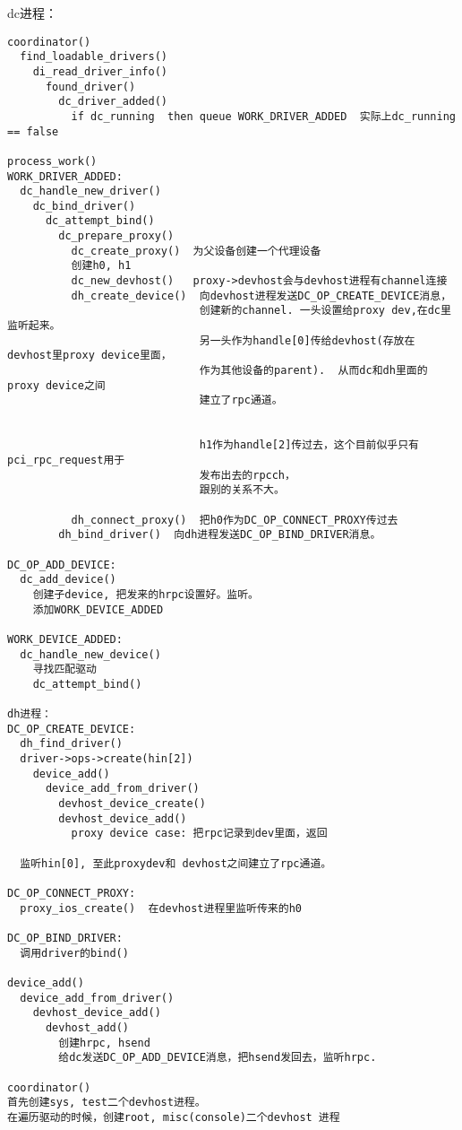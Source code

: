 dc进程：
\begin{verbatim}
coordinator()
  find_loadable_drivers()
    di_read_driver_info()
      found_driver()
        dc_driver_added()
          if dc_running  then queue WORK_DRIVER_ADDED  实际上dc_running == false

process_work()
WORK_DRIVER_ADDED:
  dc_handle_new_driver()
    dc_bind_driver()
      dc_attempt_bind()
        dc_prepare_proxy()
          dc_create_proxy()  为父设备创建一个代理设备
          创建h0, h1
          dc_new_devhost()   proxy->devhost会与devhost进程有channel连接
          dh_create_device()  向devhost进程发送DC_OP_CREATE_DEVICE消息，
                              创建新的channel. 一头设置给proxy dev,在dc里监听起来。
                              另一头作为handle[0]传给devhost(存放在devhost里proxy device里面，
                              作为其他设备的parent).  从而dc和dh里面的proxy device之间
                              建立了rpc通道。


                              h1作为handle[2]传过去，这个目前似乎只有pci_rpc_request用于
                              发布出去的rpcch，
                              跟别的关系不大。

          dh_connect_proxy()  把h0作为DC_OP_CONNECT_PROXY传过去
        dh_bind_driver()  向dh进程发送DC_OP_BIND_DRIVER消息。

DC_OP_ADD_DEVICE:
  dc_add_device()
    创建子device, 把发来的hrpc设置好。监听。
    添加WORK_DEVICE_ADDED

WORK_DEVICE_ADDED:
  dc_handle_new_device()
    寻找匹配驱动
    dc_attempt_bind()
                
dh进程：
DC_OP_CREATE_DEVICE:
  dh_find_driver()
  driver->ops->create(hin[2])
    device_add()
      device_add_from_driver()
        devhost_device_create()
        devhost_device_add()
          proxy device case: 把rpc记录到dev里面，返回
          
  监听hin[0], 至此proxydev和 devhost之间建立了rpc通道。

DC_OP_CONNECT_PROXY:
  proxy_ios_create()  在devhost进程里监听传来的h0

DC_OP_BIND_DRIVER:
  调用driver的bind()

device_add()
  device_add_from_driver()
    devhost_device_add()
      devhost_add()
        创建hrpc, hsend
        给dc发送DC_OP_ADD_DEVICE消息，把hsend发回去，监听hrpc.

coordinator()
首先创建sys, test二个devhost进程。
在遍历驱动的时候，创建root, misc(console)二个devhost 进程


\end{verbatim}
